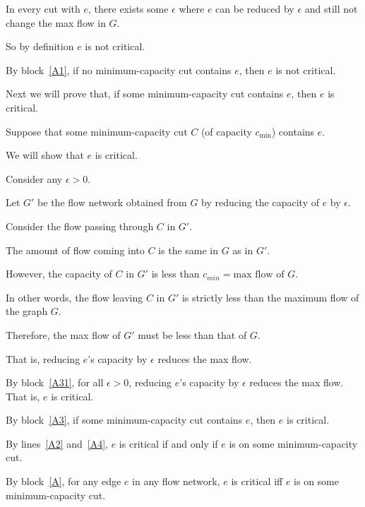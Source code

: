 \documentclass[10pt]{article}
\begin{document}
\begin{longFormProof}
\begin{block}[A]
\begin{block}[A1]
\begin{block}[A11]
      \end{block}

      \step In every cut with $e$, there exists some $\epsilon$ where $e$ can be reduced by $\epsilon$ and still not change the max flow in $G$.

      \step So by definition $e$ is not critical.
    \end{block}
    
    \step[A2] By block~\ref{A1}, if no minimum-capacity cut contains $e$, then $e$ is not critical.

    \smallskip 
    
    \lineacross 

    \step Next we will prove that, if some minimum-capacity cut contains $e$, then $e$ is critical. 

    \begin{block}[A3]
      {Suppose that some minimum-capacity cut $C$ (of capacity $c_{\min}$) contains $e$.}

      \step We will show that $e$ is critical.  

      \smallskip
      
      \begin{block}[A31]
        {Consider any $\epsilon>0$.}

        \step Let $G'$ be the flow network obtained from $G$ by reducing the capacity of $e$ by $\epsilon$.

        \step Consider the flow passing through $C$ in $G'$.

        \step The amount of flow coming into $C$ is the same in $G$ as in $G'$.

        \step However, the capacity of $C$ in $G'$ is less than $c_{min} = \text{max flow of }G$.

        \step In other words, the flow leaving $C$ in $G'$ is strictly less than the maximum flow of the graph $G$.

        \step Therefore, the max flow of $G'$ must be less than that of $G$.

        \step That is, reducing $e$'s capacity by $\epsilon$ reduces the max flow.
      \end{block}

      \medskip 

      \step By block~\ref{A31}, for all $\epsilon>0$,
      reducing $e$'s capacity by $\epsilon$ reduces the max flow.
      That is, $e$ is critical.
    \end{block}
    
    \step[A4] By block~\ref{A3}, if some minimum-capacity cut contains $e$, then $e$ is critical.
    
    \smallskip 

    \lineacross 

    \step By lines~\ref{A2} and~\ref{A4}, $e$ is critical if and only if $e$ is on some minimum-capacity cut. 
  \end{block}

  \step By block~\ref{A}, for any edge $e$ in any flow network, $e$ is critical iff $e$ is on some minimum-capacity cut. 
\end{longFormProof}
\end{document}
